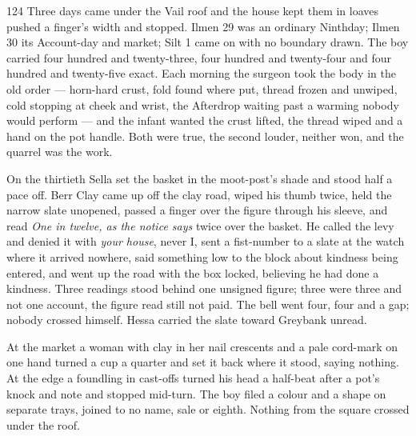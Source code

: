 
\scenebreak


\scenebreak


\scenebreak

\CRtailpiece
\begin{CRchronicle}{124}
Three days came under the Vail roof and the house kept them in loaves pushed a finger’s width and stopped. Ilmen 29 was an ordinary Ninthday; Ilmen 30 its Account-day and market; Silt 1 came on with no boundary drawn. The boy carried four hundred and twenty-three, four hundred and twenty-four and four hundred and twenty-five exact. Each morning the surgeon took the body in the old order — horn-hard crust, fold found where put, thread frozen and unwiped, cold stopping at cheek and wrist, the Afterdrop waiting past a warming nobody would perform — and the infant wanted the crust lifted, the thread wiped and a hand on the pot handle. Both were true, the second louder, neither won, and the quarrel was the work.

On the thirtieth Sella set the basket in the moot-post’s shade and stood half a pace off. Berr Clay came up off the clay road, wiped his thumb twice, held the narrow slate unopened, passed a finger over the figure through his sleeve, and read \emph{One in twelve, as the notice says} twice over the basket. He called the levy and denied it with \emph{your house}, never I, sent a fist-number to a slate at the watch where it arrived nowhere, said something low to the block about kindness being entered, and went up the road with the box locked, believing he had done a kindness. Three readings stood behind one unsigned figure; three were three and not one account, the figure read still not paid. The bell went four, four and a gap; nobody crossed himself. Hessa carried the slate toward Greybank unread.

At the market a woman with clay in her nail crescents and a pale cord-mark on one hand turned a cup a quarter and set it back where it stood, saying nothing. At the edge a foundling in cast-offs turned his head a half-beat after a pot’s knock and note and stopped mid-turn. The boy filed a colour and a shape on separate trays, joined to no name, sale or eighth. Nothing from the square crossed under the roof.


\end{CRchronicle}
